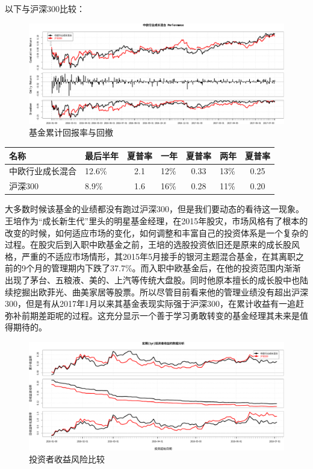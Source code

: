 \documentclass[hyperref,]{ctexart}
\begin{document}
以下与沪深300比较：

\begin{figure}[htbp]
\centering
\includegraphics{wangpei-details_files/figure-latex/unnamed-chunk-3-1.pdf}
\caption{基金累计回报率与回撤}
\end{figure}

\begin{longtable}[]{@{}llclclc@{}}
\toprule
名称 & 最后半年 & 夏普率 & 一年 & 夏普率 & 两年 & 夏普率\tabularnewline
\midrule
\endhead
中欧行业成长混合 & 12.6\% & 2.1 & 12\% & 0.33 & 13\% &
0.25\tabularnewline
沪深300 & 8.9\% & 1.6 & 16\% & 0.28 & 11\% & 0.20\tabularnewline
\bottomrule
\end{longtable}

大多数时候该基金的业绩都没有跑过沪深300，但是我们要动态的看待这一现象。王培作为``成长新生代''里头的明星基金经理，在2015年股灾，市场风格有了根本的改变的时候，如何适应市场的变化，如何调整和丰富自己的投资体系是一个复杂的过程。在股灾后到入职中欧基金之前，王培的选股投资依旧还是原来的成长股风格，严重的不适应市场情形，其2015年5月接手的银河主题混合基金，在其离职之前的9个月的管理期内下跌了37.7\%。而入职中欧基金后，在他的投资范围内渐渐出现了茅台、五粮液、美的、上汽等传统大盘股。同时他原本擅长的成长股中也陆续挖掘出欧菲光、曲美家居等股票。所以尽管目前看来他的管理业绩没有超出沪深300，但是有从2017年1月以来其基金表现实际强于沪深300，在累计收益有一追赶弥补前期差距呢的过程。这充分显示一个善于学习勇敢转变的基金经理其未来是值得期待的。

\begin{figure}[htbp]
\centering
\includegraphics{wangpei-details_files/figure-latex/unnamed-chunk-4-1.pdf}
\caption{投资者收益风险比较}
\end{figure}
\end{document}
